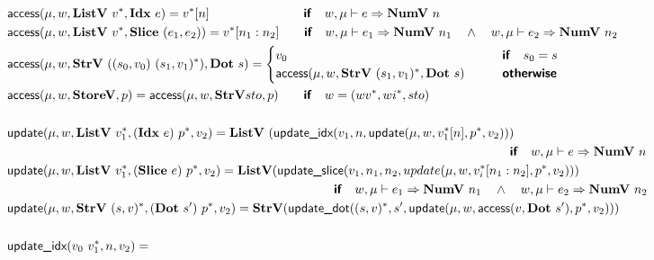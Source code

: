 \begin{align*}
  \\
%
\newline \\
  &\access(\mu, w, \listv ~ \seq{v}, \idxp ~ e) = \seq{v}[n]
  \qquad\qquad\qquad~\,\quad\premise{if}\quad w, \mu \vdash e \Rightarrow \numv ~ n \\
  &\access(\mu, w, \listv ~ \seq{v}, \slicep ~ (e_1, e_2)) = \seq{v}[n_1: n_2]
  \quad\quad\premise{if}\quad
  w, \mu \vdash e_1 \Rightarrow \numv ~ n_1 \quad\land\quad
  w, \mu \vdash e_2 \Rightarrow \numv ~ n_2 \\
  &\access(\mu, w, \strv ~ ((s_0, v_0) ~ \seq{(s_1, v_1)}), \dotp ~ s) =
  \begin{cases}
    v_0 &\quad\quad\premise{if}\quad s_0 = s \\
    \access(\mu, w, \strv ~ \seq{(s_1, v_1)}, \dotp ~ s) &\quad\quad\premise{otherwise} \\
  \end{cases}
  \\
  &\access(\mu, w, \storev, p) =\access(\mu, w, \strv sto, p)
  \quad\quad\premise{if}\quad w = (\seq{wv}, \seq{wi}, sto)\\
%
\newline \\
  &\update(\mu, w, \listv ~ \seq{v_1}, (\idxp ~ e) ~ \seq{p}, v_2) =
  \listv ~ (\updateidx(v_1, n, \update(\mu, w, \seq{v_1}[n], \seq{p}, v_2))) \\
  &\qquad\qquad\qquad\qquad\qquad\qquad\qquad\qquad\qquad\qquad\qquad\qquad\qquad\qquad\qquad\qquad\qquad\qquad\qquad\qquad\premise{if}\quad
  w, \mu \vdash e \Rightarrow \numv ~ n \\
  &\update(\mu, w, \listv ~ \seq{v_1}, (\slicep ~ e) ~ \seq{p}, v_2) =
  \listv (\updateslice(v_1, n_1, n_2, update(\mu, w, \seq{v_i}[n_1: n_2], \seq{p}, v_2))) \\
  &\qquad\qquad\qquad\qquad\qquad\qquad\qquad\qquad\qquad\qquad\qquad\qquad\qquad\premise{if}\quad
  w, \mu \vdash e_1 \Rightarrow \numv ~ n_1 \quad\land\quad
  w, \mu \vdash e_2 \Rightarrow \numv ~ n_2 \\
  &\update(\mu, w, \strv ~ \seq{(s, v)}, (\dotp ~ s') ~ \seq{p}, v_2)
  =
  \strv (\updatedot(\seq{(s, v)}, s', \update(\mu, w, \access(v, \dotp ~ s'), \seq{p}, v_2))) \\
%
\newline \\
  &\updateidx(v_0 ~ \seq{v_1}, n, v_2) =

\end{align*}
